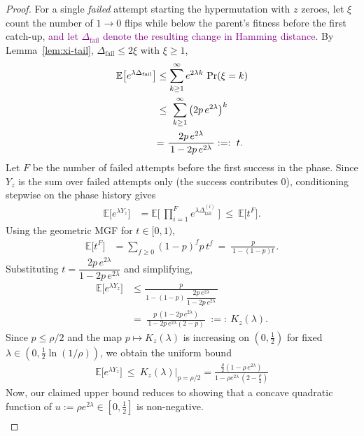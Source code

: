 \documentclass[lettersize,journal]{IEEEtran}
\newcommand{\rerev}[1]{\textcolor{purple}{#1}}
\newcommand{\EE}{\mathbb{E}}
\begin{document}
{\begin{proof}
	For a single \emph{failed} attempt starting the hypermutation with $z$ zeroes, let $\xi$ count the number of $1\!\to 0$ flips while below the parent's fitness before the first catch-up\rerev{, and let $\Delta_{\mathrm{fail}}$ denote the resulting change in Hamming distance}.
	By Lemma~\ref{lem:xi-tail}\rerev{,} $\Delta_{\mathrm{fail}}\le 2\xi$ with $\xi\ge 1$,
	\begin{align*}
		\EE\!\left[e^{\lambda \Delta_{\mathrm{fail}}}\right]
		&\le \sum_{k\ge 1}^{\infty} e^{2\lambda k}\,\Pr(\xi=k)
		\\ &\le\ \sum_{k\ge 1}^{\infty} \big(2p\,e^{2\lambda}\big)^{k}
		\\ &\textcolor{black}{=}\ \frac{2p\,e^{2\lambda}}{\,1-2p\,e^{2\lambda}\,}:=:\ t.
	\end{align*}
	Let $F$ be the number of failed attempts before the first success in the phase. Since $Y_z$ is the sum over failed attempts only (the success contributes $0$), conditioning stepwise on the phase history gives
	\begin{align*}
		\EE\!\big[e^{\lambda Y_z}\big]
		&=\EE\!\Big[\ \prod_{i=1}^{F} e^{\lambda \Delta_{\mathrm{fail}}^{(i)}}\ \Big]
		\ \le\ \EE\!\big[t^{F}\big].
	\end{align*}
	Using the geometric MGF for $t\in[0,1)$,
	\begin{align*}
		\EE\!\big[t^{F}\big]
		&=
		 \sum_{f\ge 0} (1-p)^f p\, t^f
		\ =\ \frac{p}{\,1-(1-p)t\,}.
	\end{align*}
	Substituting $t=\dfrac{2p\,e^{2\lambda}}{1-2p\,e^{2\lambda}}$ and simplifying,
	\begin{align*}
		\EE\!\big[e^{\lambda Y_z}\big]
		&\le \frac{p}{\,1-(1-p)\,\dfrac{2p\,e^{2\lambda}}{1-2p\,e^{2\lambda}}\,}
		\\ &=\ \frac{p\,(1-2p\,e^{2\lambda})}{\,1-2p\,e^{2\lambda}(2-p)\,}
		\ :=:\ K_z(\lambda).
	\end{align*}
	Since $p\le \rho/2$ and the map $p\mapsto K_z(\lambda)$ is increasing on $(0,\tfrac12)$ for fixed $\lambda\in(0,\tfrac12\ln(1/\rho))$, we obtain the uniform bound
	\begin{align*}
		\EE\!\big[e^{\lambda Y_z}\big]
		\ \le\ K_z(\lambda)\Big|_{p=\rho/2}=\frac{\tfrac{\rho}{2}(1-\rho\,e^{2\lambda})}{1-\rho e^{2\lambda}\,(2-\tfrac{\rho}{2})}
	\end{align*}
	Now, our claimed upper bound reduces to showing that a concave quadratic function of $u:=\rho e^{2\lambda} \in \left[0,\frac{1}{2}\right]$ is non-negative.
	\begin{align*}

\end{align*}
\end{proof}}
\end{document}
